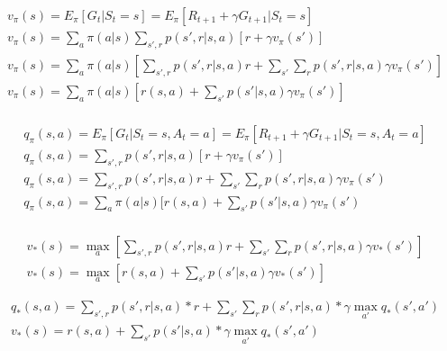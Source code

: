 \documentclass[11pt]{article}
\begin{document}
    \begin{equation}
        \begin{split}
            v_{\pi} (s) = E_{\pi} [G_t | S_t = s] = E_{\pi} [ R_{t+1} + \gamma G_{t+1} | S_t = s] \\
            v_{\pi} (s) = \sum_{a} \pi(a|s) \sum_{s',r} p(s',r|s,a) [r+\gamma v_\pi(s')] \\
            v_{\pi} (s) = \sum_{a} \pi(a|s) [\sum_{s',r} p(s',r|s,a) r + \sum_{s'}\sum_{r} p(s',r|s,a) \gamma v_\pi(s')] \\
            v_{\pi} (s) = \sum_{a} \pi(a|s) [r(s,a) + \sum_{s'} p(s'|s,a) \gamma v_\pi(s')] \\
        \end{split}
    \end{equation}

    \begin{equation}
        \begin{split}
            q_{\pi} (s, a) = E_{\pi} [G_t | S_t = s, A_t = a] = E_{\pi} [ R_{t+1} + \gamma G_{t+1} | S_t = s , A_t = a] \\
            q_{\pi} (s, a) = \sum_{s',r} p(s',r|s,a) [r+\gamma v_\pi(s')] \\
            q_{\pi} (s, a) = \sum_{s',r} p(s',r|s,a) r + \sum_{s'}\sum_{r} p(s',r|s,a) \gamma v_\pi(s') \\
            q_{\pi} (s, a) = \sum_{a} \pi(a|s) [r(s,a) + \sum_{s'} p(s'|s,a) \gamma v_\pi(s') \\
        \end{split}
    \end{equation}

    \begin{equation}
        \begin{split}
            v_* (s) = \max_{a} [\sum_{s',r} p(s',r| s, a) r+ \sum_{s'} \sum_{r} p(s',r| s, a) \gamma v_*(s')] \\
            v_* (s) = \max_{a} [ r(s,a) +  \sum_{s'} p(s'| s, a) \gamma v_*(s') ]
        \end{split}
    \end{equation}

    \begin{equation}
        \begin{split}
            q_* (s, a) =  \sum_{s',r} p(s',r| s, a) * r+ \sum_{s'} \sum_{r} p(s',r| s, a) * \gamma \max_{a'} q_*(s',a') \\
            v_* (s) = r(s, a) + \sum_{s'} p(s'| s, a) * \gamma \max_{a'} q_*(s',a')
        \end{split}
    \end{equation}
\end{document}
